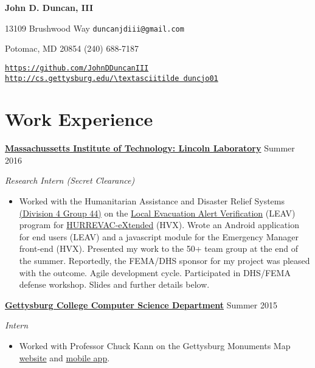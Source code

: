 \documentclass[11pt]{article}
\begin{document}
\fancyfoot{}
\pagestyle{fancy}
\thispagestyle{empty}
\renewcommand{\headrulewidth}{0pt}
\begin{center}
	{\huge \textbf{John D. Duncan, III}}
\end{center}
13109 Brushwood Way
\hfill
\texttt{duncanjdiii@gmail.com}

Potomac, MD 20854
\hfill
(240) 688-7187

\texttt{\url{https://github.com/JohnDDuncanIII}}
\hfill
\texttt{\url{http://cs.gettysburg.edu/\textasciitilde duncjo01}}

\section*{Work Experience}
\textbf{\href{http://www.ll.mit.edu/}{Massachussetts Institute of Technology: Lincoln Laboratory}}
\hfill
Summer 2016

\textit{Research Intern \small{(Secret Clearance)}}

\begin{itemize}
\item Worked with the Humanitarian Assistance and Disaster Relief Systems \href{https://www.ll.mit.edu/employment/division4.html#gp44}{(Division 4 Group 44)} on the \href{https://www.dhs.gov/publication/national-hurricane-program-technology-modernization-local-evacuation-alert-verification}{Local Evacuation Alert Verification} (LEAV) program for \href{https://www.dhs.gov/publication/national-hurricane-program-technology-modernization-hurrevac-extended-hv-x}{HURREVAC-eXtended} (HVX). Wrote an Android application for end users (LEAV) and a javascript module for the Emergency Manager front-end (HVX). Presented my work to the 50+ team group at the end of the summer. Reportedly, the FEMA/DHS sponsor for my project was pleased with the outcome. Agile development cycle. Participated in DHS/FEMA defense workshop. Slides and further details below.\\
\end{itemize}

\textbf{\href{http://cs.gettysburg.edu/}{Gettysburg College Computer Science Department}}
\hfill
Summer 2015

\textit{Intern}

\begin{itemize}
\item Worked with Professor Chuck Kann on the Gettysburg Monuments Map \href{http://historicgettysburg.us/MonumentsMap/Monuments.html}{website} and \href{https://play.google.com/store/apps/details?id=edu.gettysburg.MonumentsMap}{mobile app}.\\
\end{itemize}
\end{document}
